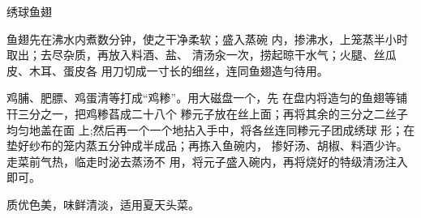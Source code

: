 \begin{recipe}{绣球鱼翅}

\ingredients



\cooking

\step 鱼翅先在沸水内煮数分钟，使之干净柔软；盛入蒸碗 内，掺沸水，上笼蒸半小时取出；去尽杂质，再放入料酒、盐、 清汤汆一次，捞起晾干水气；火腿、丝瓜皮、木耳、蛋皮各 用刀切成一寸长的细丝，连同鱼翅造勻待用。

鸡脯、肥膘、鸡蛋清等打成“鸡糁”。用大磁盘一个，先 在盘内将造匀的鱼翅等铺幵三分之一，把鸡糁萏成二十八个 糁元子放在丝上面；再将其余的三分之二丝子均匀地盖在面 上;然后再一个一个地拈入手中，将各丝连同糁元子团成绣球 形；在垫好纱布的笼内蒸五分钟成半成品；再拣入鱼碗内， 掺好汤、胡椒、料酒少许。走菜前气热，临走时泌去蒸汤不 用，将元子盛入碗内，再将烧好的特级清汤注入即可。

\notes

质优色美，味鲜清淡，适用夏天头菜。

\end{recipe}

